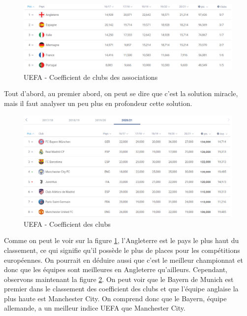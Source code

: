 \documentclass[a4paper,14pt]{extarticle}
\begin{document}
{\begin{figure}[htp]
    \centering
    \includegraphics[width=16cm]{../img/coeffClubAssoc.png}
    \caption{UEFA - Coefficient de clubs des associations}
    \label{fig:coeffClubsAssoc}
\end{figure}

Tout d'abord, au premier abord, on peut se dire que c'est la solution miracle, mais il faut analyser un peu plus en profondeur cette solution.

\begin{figure}[htp]
    \centering
    \includegraphics[width=16cm]{../img/coeffClubs.png}
    \caption{UEFA - Coefficient des clubs}
    \label{fig:coeffClubs}
\end{figure}

Comme on peut le voir sur la figure \ref{fig:coeffClubsAssoc}, l'Angleterre est le pays le plus haut du classement, ce qui signifie qu'il possède le plus de places pour les compétitions européennes. On pourrait en déduire aussi que c'est le meilleur championnat et donc que les équipes sont meilleures en Angleterre qu'ailleurs. Cependant, observons maintenant la figure \ref{fig:coeffClubs}. On peut voir que le Bayern de Munich est premier dans le classement des coefficient des clubs et que l'équipe anglaise la plus haute est Manchester City. On comprend donc que le Bayern, équipe allemande, a un meilleur indice UEFA que Manchester City.

}
\end{document}
